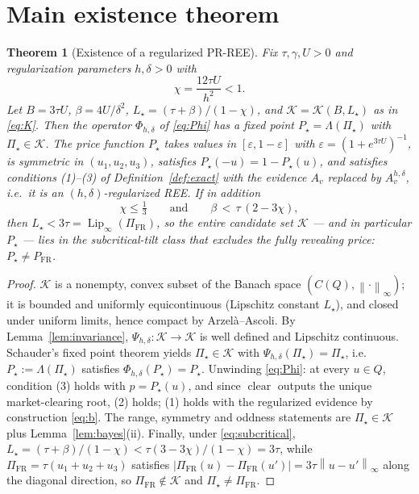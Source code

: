 \documentclass[11pt]{article}
\newtheorem{theorem}{Theorem}
\theoremstyle{definition}
\newcommand{\Lam}{\Lambda}
\newcommand{\clear}{\operatorname{clear}}
\newcommand{\Lip}{\operatorname{Lip}}
\newcommand{\norm}[1]{\left\lVert #1 \right\rVert}
\newcommand{\Kc}{\mathcal{K}}
\begin{document}
\section{Main existence theorem}\label{sec:main}

\begin{theorem}[Existence of a regularized PR-REE]\label{thm:main}
Fix $\tau,\gamma,U>0$ and regularization parameters $h,\delta>0$ with
\[
\chi=\frac{12\tau U}{h^2}<1 .
\]
Let $B=3\tau U$, $\beta=4U/\delta^2$, $L_\star=(\tau+\beta)/(1-\chi)$, and
$\Kc=\Kc(B,L_\star)$ as in \eqref{eq:K}. Then the operator
$\Phi_{h,\delta}$ of \eqref{eq:Phi} has a fixed point
$P_\star=\Lam(\Pi_\star)$ with $\Pi_\star\in\Kc$. The price function
$P_\star$ takes values in $[\varepsilon,1-\varepsilon]$ with
$\varepsilon=(1+e^{3\tau U})^{-1}$, is symmetric in $(u_1,u_2,u_3)$,
satisfies $P_\star(-u)=1-P_\star(u)$, and satisfies conditions (1)--(3) of
Definition~\ref{def:exact} with the evidence $A_v$ replaced by
$A_v^{h,\delta}$, i.e.\ it is an $(h,\delta)$-regularized REE. If in
addition
\begin{equation}\label{eq:subcritical}
\chi\le\tfrac13
\qquad\text{and}\qquad
\beta\,<\,\tau\,(2-3\chi),
\end{equation}
then $L_\star<3\tau=\Lip_\infty(\Pi_{\mathrm{FR}})$, so the entire candidate
set $\Kc$ — and in particular $P_\star$ — lies in the subcritical-tilt class
that excludes the fully revealing price: $P_\star\neq P_{\mathrm{FR}}$.
\end{theorem}

\begin{proof}
$\Kc$ is a nonempty, convex subset of the Banach space
$(C(Q),\norm{\cdot}_\infty)$; it is bounded and uniformly equicontinuous
(Lipschitz constant $L_\star$), and closed under uniform limits, hence
compact by Arzel\`a--Ascoli. By Lemma~\ref{lem:invariance},
$\Psi_{h,\delta}:\Kc\to\Kc$ is well defined and Lipschitz continuous.
Schauder's fixed point theorem \cite[Cor.~2.13]{Zeidler} yields
$\Pi_\star\in\Kc$ with $\Psi_{h,\delta}(\Pi_\star)=\Pi_\star$, i.e.\
$P_\star:=\Lam(\Pi_\star)$ satisfies $\Phi_{h,\delta}(P_\star)=P_\star$.
Unwinding \eqref{eq:Phi}: at every $u\in Q$, condition (3) holds with
$p=P_\star(u)$, and since $\clear$ outputs the unique market-clearing root,
(2) holds; (1) holds with the regularized evidence by construction
\eqref{eq:b}. The range, symmetry and oddness statements are
$\Pi_\star\in\Kc$ plus Lemma~\ref{lem:bayes}(ii). Finally, under
\eqref{eq:subcritical},
$L_\star=(\tau+\beta)/(1-\chi)<\tau(3-3\chi)/(1-\chi)=3\tau$, while
$\Pi_{\mathrm{FR}}=\tau(u_1+u_2+u_3)$ satisfies
$|\Pi_{\mathrm{FR}}(u)-\Pi_{\mathrm{FR}}(u')|=3\tau\norm{u-u'}_\infty$ along
the diagonal direction, so $\Pi_{\mathrm{FR}}\notin\Kc$ and
$\Pi_\star\neq\Pi_{\mathrm{FR}}$.
\end{proof}
\end{document}
